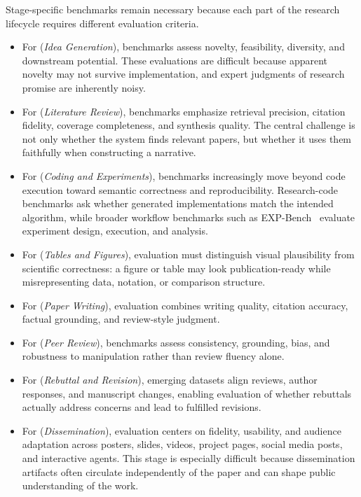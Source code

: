 Stage-specific benchmarks remain necessary because each part of the research lifecycle requires different evaluation criteria. 
\begin{itemize}
    \item For \Sone (\emph{Idea Generation}), benchmarks assess novelty, feasibility, diversity, and downstream potential. These evaluations are difficult because apparent novelty may not survive implementation, and expert judgments of research promise are inherently noisy.

    \item For \Stwo (\emph{Literature Review}), benchmarks emphasize retrieval precision, citation fidelity, coverage completeness, and synthesis quality. The central challenge is not only whether the system finds relevant papers, but whether it uses them faithfully when constructing a narrative.

    \item For \Sthree (\emph{Coding and Experiments}), benchmarks increasingly move beyond code execution toward semantic correctness and reproducibility. Research-code benchmarks ask whether generated implementations match the intended algorithm, while broader workflow benchmarks such as EXP-Bench~\cite{expbench2025} evaluate experiment design, execution, and analysis.

    \item For \Sfour (\emph{Tables and Figures}), evaluation must distinguish visual plausibility from scientific correctness: a figure or table may look publication-ready while misrepresenting data, notation, or comparison structure.

    \item For \Sfive (\emph{Paper Writing}), evaluation combines writing quality, citation accuracy, factual grounding, and review-style judgment.

    \item For \Ssix (\emph{Peer Review}), benchmarks assess consistency, grounding, bias, and robustness to manipulation rather than review fluency alone.

    \item For \Sseven (\emph{Rebuttal and Revision}), emerging datasets align reviews, author responses, and manuscript changes, enabling evaluation of whether rebuttals actually address concerns and lead to fulfilled revisions.

    \item For \Seight (\emph{Dissemination}), evaluation centers on fidelity, usability, and audience adaptation across posters, slides, videos, project pages, social media posts, and interactive agents. This stage is especially difficult because dissemination artifacts often circulate independently of the paper and can shape public understanding of the work.
\end{itemize} 


